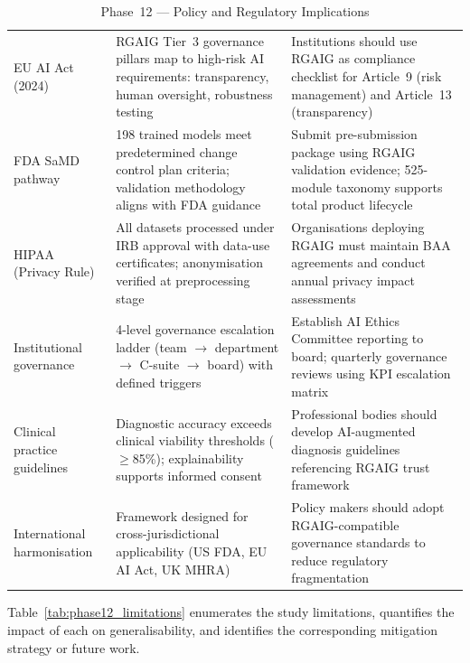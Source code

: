 \begingroup\singlespacing\tablefontsize\tablestripes
\begin{xltabular}{\textwidth}{@{} l X X @{}}
\caption{Phase~12 --- Policy and Regulatory Implications}
\label{tab:phase12_policy}\\
\toprule
{} &  &  \\
\midrule
\endfirsthead
\endhead
\bottomrule
\endlastfoot
EU AI Act (2024)              & RGAIG Tier~3 governance pillars map to high-risk AI requirements: transparency, human oversight, robustness testing & Institutions should use RGAIG as compliance checklist for Article~9 (risk management) and Article~13 (transparency) \\
\addlinespace
FDA SaMD pathway              & 198 trained models meet predetermined change control plan criteria; validation methodology aligns with FDA guidance & Submit pre-submission package using RGAIG validation evidence; 525-module taxonomy supports total product lifecycle \\
\addlinespace
HIPAA (Privacy Rule)          & All datasets processed under IRB approval with data-use certificates; anonymisation verified at preprocessing stage & Organisations deploying RGAIG must maintain BAA agreements and conduct annual privacy impact assessments \\
\addlinespace
Institutional governance      & 4-level governance escalation ladder (team $\rightarrow$ department $\rightarrow$ C-suite $\rightarrow$ board) with defined triggers & Establish AI Ethics Committee reporting to board; quarterly governance reviews using KPI escalation matrix \\
\addlinespace
Clinical practice guidelines  & Diagnostic accuracy exceeds clinical viability thresholds ($\geq$85\%); explainability supports informed consent & Professional bodies should develop AI-augmented diagnosis guidelines referencing RGAIG trust framework \\
\addlinespace
International harmonisation   & Framework designed for cross-jurisdictional applicability (US FDA, EU AI Act, UK MHRA)                              & Policy makers should adopt RGAIG-compatible governance standards to reduce regulatory fragmentation \\
\end{xltabular}
\endgroup

\vspace{1.5em}

Table~\ref{tab:phase12_limitations} enumerates the study limitations, quantifies the impact of each on generalisability, and identifies the corresponding mitigation strategy or future work.

